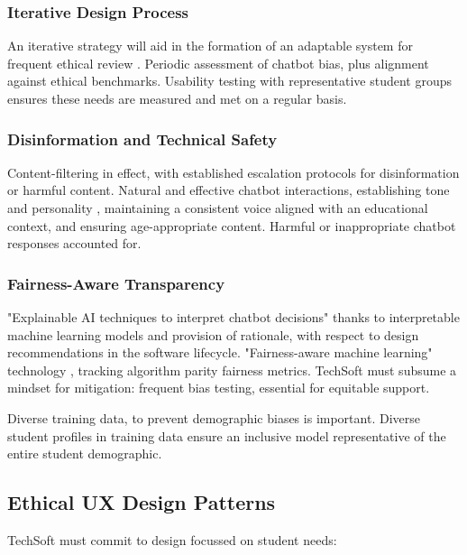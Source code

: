 \documentclass[14pt,a4paper]{article}
\begin{document}
\begin{multicols}{2}
\subsubsection{Iterative Design Process}
An iterative strategy \textit{\parencite[pp. 30-60]{HoltzblattBeyer2024}} will aid in the formation of an adaptable system for frequent ethical review \textit{\parencite{FloridiCowls2024}}.
Periodic assessment of chatbot bias, plus alignment against ethical benchmarks.
Usability testing with representative student groups ensures these needs are measured and met on a regular basis.

\subsubsection{Disinformation and Technical Safety}
Content-filtering in effect, with established escalation protocols for disinformation or harmful content.
Natural and effective chatbot interactions, establishing tone and personality \textit{\parencite[pp. 20-50]{Bradbury2024}}, maintaining a consistent voice aligned with an educational context, and ensuring age-appropriate content.
Harmful or inappropriate chatbot responses \textit{\parencite[p. e11510]{Bickmore2021}} accounted for.

\subsubsection{Fairness-Aware Transparency}
 "Explainable AI techniques to interpret chatbot decisions" \textit{\parencite[pp. 82-115]{Arrieta2022}} thanks to interpretable machine learning models and provision of rationale, with respect to design recommendations in the software lifecycle.
"Fairness-aware machine learning" technology \textit{\parencite{Barocas2021}}, tracking algorithm parity fairness metrics.
    TechSoft must subsume a mindset for mitigation: frequent bias testing, essential for equitable support.

Diverse training data, to prevent demographic biases \textit{\parencite[pp. 1-35]{Mehrabi2024}} is important.
Diverse student profiles in training data ensure an inclusive model representative of the entire student demographic.


\subsection{Ethical UX Design Patterns}
TechSoft must commit to design focussed on student needs:


\end{multicols}
\end{document}

